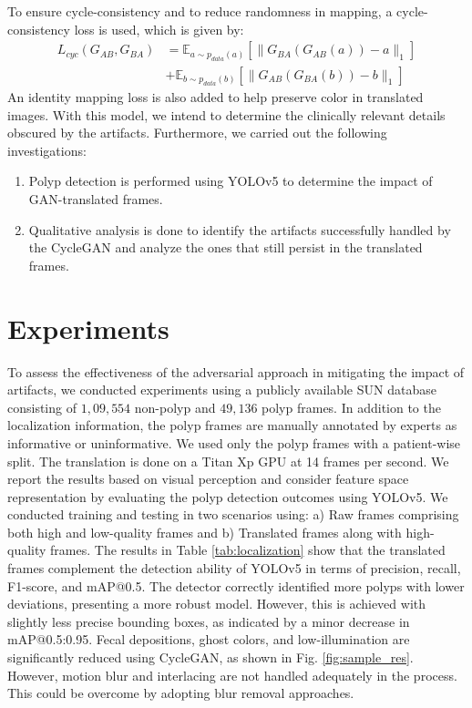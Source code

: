 \documentclass[letterpaper]{article} %
\begin{document}
To ensure cycle-consistency and to reduce randomness in mapping, a cycle-consistency loss is used, which is given by:
\begin{equation}
   \begin{split}
    L_{cyc}(G_{AB}, G_{BA}) & = \mathbb{E}_{a\sim p_{data}(a)}[\lVert G_{BA}(G_{AB}(a))-a\rVert_1] \\ & + \mathbb{E}_{b\sim p_{data}(b)}[\lVert G_{AB}(G_{BA}(b))-b\rVert_1]
  \end{split}
\end{equation}
An identity mapping loss is also added to help preserve color in translated images.
With this model, we intend to determine the clinically relevant details obscured by the artifacts. Furthermore, we carried out the following investigations:
\begin{enumerate}
    \item Polyp detection is performed using YOLOv5 \cite{yolov5} to determine the impact of GAN-translated frames.
    \item Qualitative analysis is done to identify the artifacts successfully handled by the CycleGAN and analyze the ones that still persist in the translated frames.
\end{enumerate}




\section{Experiments}
To assess the effectiveness of the adversarial approach in mitigating the impact of artifacts, we conducted experiments using a publicly available SUN database \cite{misawa2021development} consisting of $1,09,554$ non-polyp and $49,136$ polyp frames. In addition to the localization information, the polyp frames are manually annotated by experts as informative or uninformative. We used only the polyp frames with a patient-wise split.
The translation is done on a Titan Xp GPU at 14 frames per second.
We report the results based on visual perception and consider feature space representation by evaluating the polyp detection outcomes using YOLOv5. We conducted training and testing in two scenarios using: a) Raw frames comprising both high and low-quality frames and b) Translated frames along with high-quality frames. The results in Table \ref{tab:localization} show that the translated frames complement the detection ability of YOLOv5 in terms of precision, recall, F1-score, and mAP@0.5. The detector correctly identified more polyps with lower deviations, presenting a more robust model. However, this is achieved with slightly less precise bounding boxes, as indicated by a minor decrease in mAP@0.5:0.95. Fecal depositions, ghost colors, and low-illumination are significantly reduced using CycleGAN, as shown in Fig. \ref{fig:sample_res}. However, motion blur and interlacing are not handled adequately in the process. This could be overcome by adopting blur removal approaches.
\end{document}
